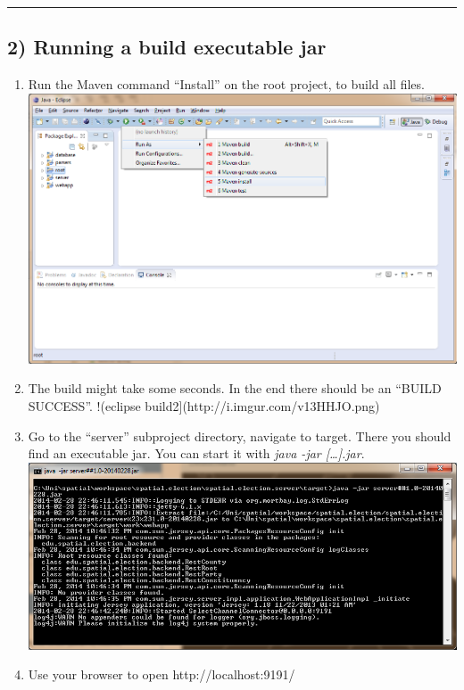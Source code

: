 \begin{center}\rule{3in}{0.4pt}\end{center}

\subsection{2) Running a build executable
jar}\label{running-a-build-executable-jar}

\begin{enumerate}
\def\labelenumi{\arabic{enumi}.}
\itemsep1pt\parskip0pt
\item
  Run the Maven command ``Install'' on the root project, to build all
  files. \includegraphics[width=1.1\textwidth]{../img/fvcN51B.png}
\item
  The build might take some seconds. In the end there should be an
  ``BUILD SUCCESS''. !(eclipse build2{]}(http://i.imgur.com/v13HHJO.png)
\item
  Go to the ``server'' subproject directory, navigate to target. There
  you should find an executable jar. You can start it with \emph{java
  -jar {[}\ldots{}{]}.jar}.
  \includegraphics[width=1.1\textwidth]{../img/wFn3GVG.png}
\item
  Use your browser to open http://localhost:9191/
\end{enumerate}

